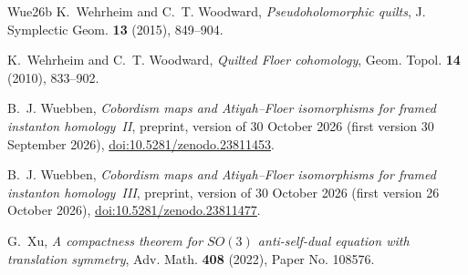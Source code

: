 \documentclass[11pt]{amsart}
\theoremstyle{definition}
\theoremstyle{remark}
\theoremstyle{plain}
\numberwithin{equation}{section}
\begin{document}
\begin{thebibliography}{Wue26b}
K.~Wehrheim and C.~T. Woodward, \emph{Pseudoholomorphic quilts}, J.
Symplectic Geom. \textbf{13} (2015), 849--904.

K.~Wehrheim and C.~T. Woodward, \emph{Quilted Floer cohomology}, Geom.
Topol. \textbf{14} (2010), 833--902.

B.~J. Wuebben, \emph{Cobordism maps and Atiyah--Floer isomorphisms for framed
instanton homology~II}, preprint, version of 30 October 2026
(first version 30 September 2026),
\href{https://doi.org/10.5281/zenodo.23811453}{doi:10.5281/zenodo.23811453}.

B.~J. Wuebben, \emph{Cobordism maps and Atiyah--Floer isomorphisms for framed
instanton homology~III}, preprint, version of 30 October 2026
(first version 26 October 2026),
\href{https://doi.org/10.5281/zenodo.23811477}{doi:10.5281/zenodo.23811477}.

G.~Xu, \emph{A compactness theorem for $SO(3)$ anti-self-dual equation with
translation symmetry}, Adv. Math. \textbf{408} (2022), Paper No. 108576.


\end{thebibliography}
\end{document}
